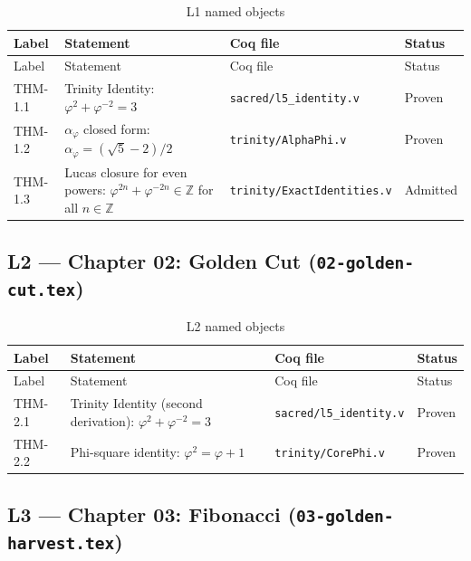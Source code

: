 \begin{longtable}{lp{6cm}ll}
\toprule
Label & Statement & Coq file & Status \\
\midrule
\endfirsthead
\toprule
Label & Statement & Coq file & Status \\
\midrule
\endhead
\bottomrule
\endfoot
\bottomrule
\caption{L1 named objects}
\endlastfoot
THM-1.1 & Trinity Identity:
  $\varphi^{2}+\varphi^{-2}=3$ &
  \texttt{sacred/l5\_identity.v} & Proven \\
THM-1.2 & $\alpha_{\varphi}$ closed form:
  $\alpha_{\varphi} = (\sqrt{5}-2)/2$ &
  \texttt{trinity/AlphaPhi.v} & Proven \\
THM-1.3 & Lucas closure for even powers:
  $\varphi^{2n}+\varphi^{-2n}\in\mathbb{Z}$ for all $n\in\mathbb{Z}$ &
  \texttt{trinity/ExactIdentities.v} & Admitted \\
\end{longtable}

\subsection{L2 — Chapter 02: Golden Cut (\texttt{02-golden-cut.tex})}
\label{sec:A-L2}

\begin{longtable}{lp{6cm}ll}
\toprule
Label & Statement & Coq file & Status \\
\midrule
\endfirsthead
\toprule
Label & Statement & Coq file & Status \\
\midrule
\endhead
\bottomrule
\endfoot
\bottomrule
\caption{L2 named objects}
\endlastfoot
THM-2.1 & Trinity Identity (second derivation):
  $\varphi^{2}+\varphi^{-2}=3$ &
  \texttt{sacred/l5\_identity.v} & Proven \\
THM-2.2 & Phi-square identity: $\varphi^{2}=\varphi+1$ &
  \texttt{trinity/CorePhi.v} & Proven \\
\end{longtable}

\subsection{L3 — Chapter 03: Fibonacci (\texttt{03-golden-harvest.tex})}
\label{sec:A-L3}

